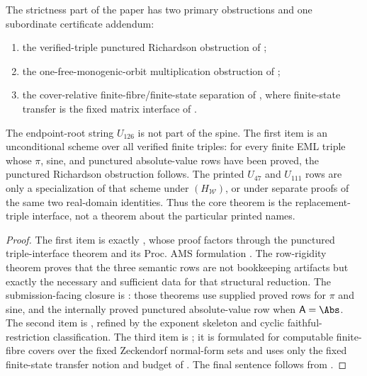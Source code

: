 \begin{proposition}
\label{thm:obstruction-spine}
The strictness part of the paper has two primary obstructions and one subordinate
certificate addendum:
\begin{enumerate}
\item the verified-triple punctured Richardson obstruction of
  ;
\item the one-free-monogenic-orbit multiplication obstruction of
  ;
\item the cover-relative finite-fibre/finite-state separation of
  , where finite-state transfer is the fixed
  matrix interface of .
\end{enumerate}
The endpoint-root string \(U_{126}\) is not part of the spine.  The first item is
an unconditional scheme over all verified finite triples: for every finite EML
triple whose \(\pi\), sine, and punctured absolute-value rows have been proved,
the punctured Richardson obstruction follows.  The printed \(U_{47}\) and
\(U_{111}\) rows are only a specialization of that scheme under
\((H_{\mathcal W})\), or under separate proofs of the same two real-domain
identities.  Thus the core theorem is the replacement-triple interface, not a
theorem about the particular printed names.
\end{proposition}

\begin{proof}
The first item is exactly , whose proof factors through the
punctured triple-interface theorem
 and its Proc. AMS formulation
.  The row-rigidity theorem
 proves that the three semantic rows
are not bookkeeping artifacts but exactly the necessary and sufficient data for
that structural reduction.  The submission-facing closure is
: those theorems use
supplied proved rows for \(\pi\) and sine, and the internally proved punctured
absolute-value row when \(\mathsf A=\Abs\).
The second item is , refined by the exponent
skeleton and cyclic faithful-restriction classification.  The third item is
; it is formulated for computable finite-fibre
covers over the fixed Zeckendorf normal-form sets and uses only the fixed
finite-state transfer notion and budget of
.
The final sentence follows from
.
\end{proof}

